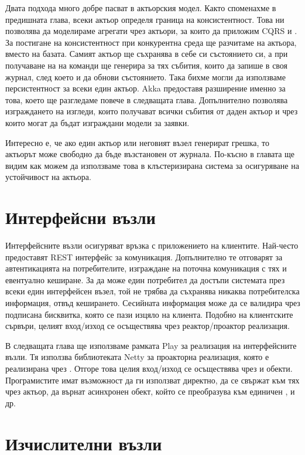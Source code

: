 Двата подхода много добре пасват в актьорския модел. Както споменахме в предишната глава, всеки актьор определя граница на консистентност. Това ни позволява да моделираме агрегати чрез актьори, за които да приложим CQRS и . За постигане на консистентност при конкурентна среда ще разчитаме на актьора, вместо на базата. Самият актьор ще съхранява в себе си състоянието си, а при получаване на на команди ще генерира за тях събития, които да запише в своя журнал, след което и да обнови състоянието. Така бихме могли да използваме персистентност за всеки един актьор. Akka предоставя разширение именно за това, което ще разгледаме повече в следващата глава. Допълнително позволява изграждането на изгледи, които получават всички събития от даден актьор и чрез които могат да бъдат изграждани модели за заявки.

Интересно е, че ако един актьор или неговият възел генерират грешка, то актьорът може свободно да бъде възстановен от журнала. По-късно в главата ще видим как можем да използваме това в клъстеризирана система за осигуряване на устойчивост на актьора.

\section{Интерфейсни възли}

Интерфейсните възли осигуряват връзка с приложението на клиентите. Най-често предоставят REST интерфейс за комуникация. Допълнително те отговарят за автентикацията на потребителите, изграждане на поточна комуникация с тях и евентуално кеширане. За да може един потребител да достъпи системата през всеки един интерфейсен възел, той не трябва да съхранява никаква потребителска информация, отвъд кеширането. Сесийната информация може да се валидира чрез подписана бисквитка, която се пази изцяло на клиента. Подобно на клиентските сървъри, целият вход/изход се осъществява чрез реактор/проактор реализация.

В следващата глава ще използваме рамката Play за реализация на интерфейсните възли. Тя използва библиотеката Netty за проакторна реализация, която е реализирана чрез . Отгоре това целия вход/изход се осъществява чрез  и  обекти. Програмистите имат възможност да ги използват директно, да се свържат към тях чрез актьор, да върнат асинхронен  обект, който се преобразува към единичен , и др.

\section{Изчислителни възли}

